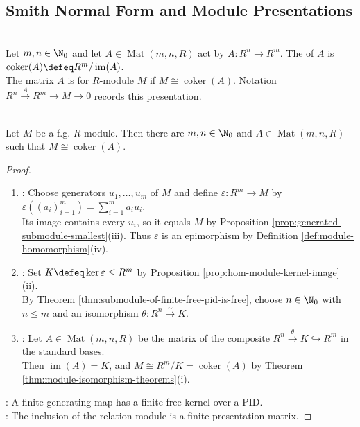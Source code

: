 \subsection{Smith Normal Form and Module Presentations}

\begin{definition} \label{def:finite-free-presentation-and-cokernel} \\
Let $m,n\in\N_0$ and let $A\in\operatorname{Mat}(m,n,R)$ act by $A:R^n\to R^m$. The  of $A$ is $\operatorname{coker}(A)\defeq R^m/\operatorname{im}(A)$.\\
The matrix $A$ is  for $R$-module $M$ if $M\cong\operatorname{coker}(A)$. Notation $R^n\xrightarrow{A}R^m\to M\to0$ records this presentation.
\end{definition}

\begin{proposition} \label{prop:finitely-generated-pid-module-finite-presentation} \\
Let $M$ be a f.g. $R$-module. Then there are $m,n\in\N_0$ and $A\in\operatorname{Mat}(m,n,R)$ such that $M\cong\operatorname{coker}(A)$.
\begin{proof}
\begin{enumerate}[label=(\roman*)]
\setlength{\itemsep}{0pt}
\item {}: Choose generators $u_1,\ldots,u_m$ of $M$ and define $\varepsilon:R^m\to M$ by $\varepsilon((a_i)_{i=1}^m)=\sum_{i=1}^m a_iu_i$.\\
Its image contains every $u_i$, so it equals $M$ by Proposition \ref{prop:generated-submodule-smallest}(iii). Thus $\varepsilon$ is an epimorphism by Definition \ref{def:module-homomorphism}(iv).
\item {}: Set $K\defeq\ker\varepsilon\leq R^m$ by Proposition \ref{prop:hom-module-kernel-image}(ii).\\
By Theorem \ref{thm:submodule-of-finite-free-pid-is-free}, choose $n\in\N_0$ with $n\leq m$ and an isomorphism $\theta:R^n\xrightarrow{\sim}K$.
\item {}: Let $A\in\operatorname{Mat}(m,n,R)$ be the matrix of the composite $R^n\xrightarrow{\theta}K\hookrightarrow R^m$ in the standard bases.\\
Then $\operatorname{im}(A)=K$, and $M\cong R^m/K=\operatorname{coker}(A)$ by Theorem \ref{thm:module-isomorphism-theorems}(i).
\end{enumerate}
: A finite generating map has a finite free kernel over a PID.\\
: The inclusion of the relation module is a finite presentation matrix.
\end{proof}
\end{proposition}

